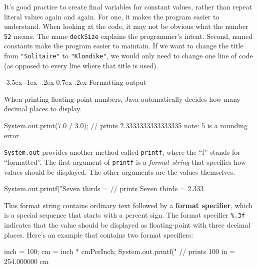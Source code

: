 \documentclass[12pt]{book}
\makeatletter
\renewcommand{\section}{\@startsection {section}{1}{\z@}%
    {-3.5ex \@plus -1ex \@minus -.2ex}%
    {0.7ex \@plus.2ex}%
    {\normalfont\Large\bfseries}}
\theoremstyle{exercise}
\newcommand{\java}[1]{\lstinline{#1}} %
\makeatother
\begin{document}
It's good practice to create final variables for constant values, rather than repeat literal values again and again.
For one, it makes the program easier to understand.
When looking at the code, it may not be obvious what the number \java{52} means.
The name \java{deckSize} explains the programmer's intent.
Second, named constants make the program easier to maintain.
If we want to change the title from \java{"Solitaire"} to \java{"Klondike"}, we would only need to change one line of code (as opposed to every line where that title is used).


\section{Formatting output}

When printing floating-point numbers, Java automatically decides how many decimal places to display.


\begin{code}
    System.out.print(7.0 / 3.0);
    // prints 2.3333333333333335   note: 5 is a rounding error
\end{code}


\java{System.out} provides another method called \java{printf}, where the ``f'' stands for ``formatted''.
The first argument of \java{printf} is a {\em format string} that specifies how values should be displayed.
The other arguments are the values themselves.

\begin{code}
    System.out.printf("Seven thirds = %
    // prints Seven thirds = 2.333
\end{code}


This format string contains ordinary text followed by a {\bf format specifier}, which is a special sequence that starts with a percent sign.
The format specifier \verb"%.3f" indicates that the value should be displayed as floating-point with three decimal places.
Here's an example that contains two format specifiers:

\begin{code}
   inch = 100;
   cm = inch * cmPerInch;
   System.out.printf("%
   // prints 100 in = 254.000000 cm
\end{code}
\end{document}

